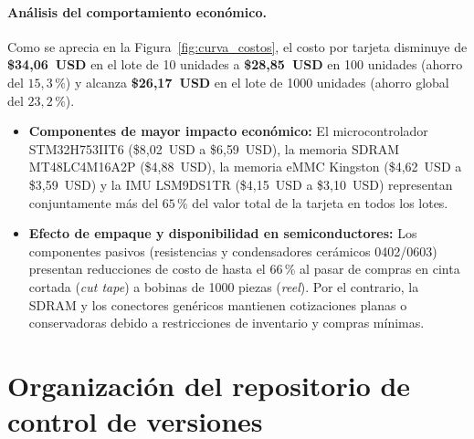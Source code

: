 \documentclass[11pt,a4paper]{article}
\begin{document}
\paragraph{Análisis del comportamiento económico.}
Como se aprecia en la Figura~\ref{fig:curva_costos}, el costo por tarjeta disminuye de \textbf{\$34{,}06~USD} en el lote de 10 unidades a \textbf{\$28{,}85~USD} en 100 unidades (ahorro del $15{,}3\,\%$) y alcanza \textbf{\$26{,}17~USD} en el lote de 1000 unidades (ahorro global del $23{,}2\,\%$). 
\begin{itemize}
    \item \textbf{Componentes de mayor impacto económico:} El microcontrolador STM32H753IIT6 (\$8{,}02~USD a \$6{,}59~USD), la memoria SDRAM MT48LC4M16A2P (\$4{,}88~USD), la memoria eMMC Kingston (\$4{,}62~USD a \$3{,}59~USD) y la IMU LSM9DS1TR (\$4{,}15~USD a \$3{,}10~USD) representan conjuntamente más del $65\,\%$ del valor total de la tarjeta en todos los lotes.
    \item \textbf{Efecto de empaque y disponibilidad en semiconductores:} Los componentes pasivos (resistencias y condensadores cerámicos 0402/0603) presentan reducciones de costo de hasta el $66\,\%$ al pasar de compras en cinta cortada (\emph{cut tape}) a bobinas de 1000 piezas (\emph{reel}). Por el contrario, la SDRAM y los conectores genéricos mantienen cotizaciones planas o conservadoras debido a restricciones de inventario y compras mínimas.
\end{itemize}


\label{tab:costos_detalle}


\label{tab:precios_fuentes}

\section{Organización del repositorio de control de versiones}\label{sec:repo}
\end{document}
